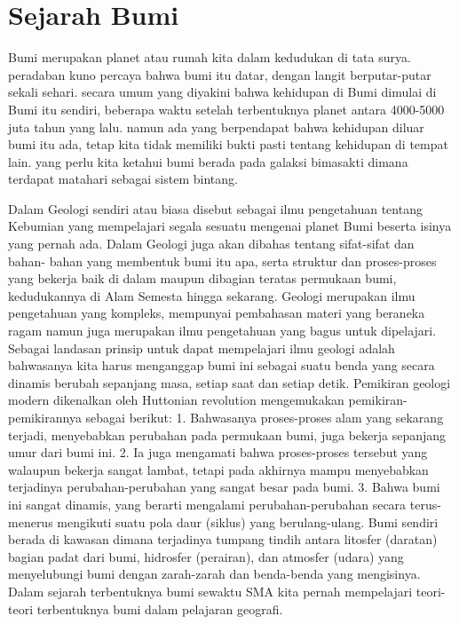 
\section{Sejarah Bumi}
Bumi merupakan planet atau rumah kita dalam kedudukan di tata surya. peradaban kuno percaya bahwa bumi itu datar, dengan langit berputar-putar sekali sehari. secara umum yang diyakini bahwa kehidupan di Bumi dimulai di Bumi itu sendiri, beberapa waktu setelah terbentuknya planet antara 4000-5000 juta tahun yang lalu. namun ada yang berpendapat bahwa kehidupan diluar bumi itu ada, tetap kita tidak memiliki bukti pasti tentang kehidupan di tempat lain. yang perlu kita ketahui bumi berada pada galaksi bimasakti dimana terdapat matahari sebagai sistem bintang.

Dalam Geologi sendiri atau biasa disebut sebagai ilmu pengetahuan tentang Kebumian yang mempelajari segala sesuatu mengenai planet Bumi beserta isinya yang pernah ada. Dalam Geologi juga akan dibahas tentang sifat-sifat dan bahan- bahan yang membentuk bumi itu apa, serta struktur dan proses-proses yang bekerja baik di dalam maupun dibagian teratas permukaan bumi, kedudukannya di Alam Semesta hingga sekarang. Geologi merupakan ilmu pengetahuan yang kompleks, mempunyai pembahasan materi yang beraneka ragam namun juga merupakan ilmu pengetahuan yang bagus untuk dipelajari. Sebagai landasan prinsip untuk dapat mempelajari ilmu geologi adalah bahwasanya kita harus menganggap bumi ini sebagai suatu benda yang secara dinamis berubah sepanjang masa, setiap saat dan setiap detik. 
Pemikiran geologi modern dikenalkan oleh Huttonian revolution mengemukakan pemikiran-pemikirannya sebagai berikut:
1. Bahwasanya proses-proses alam yang sekarang terjadi, menyebabkan perubahan pada permukaan bumi, juga bekerja sepanjang umur dari bumi ini. 
2. Ia juga mengamati bahwa proses-proses tersebut yang walaupun bekerja sangat lambat, tetapi pada akhirnya mampu menyebabkan terjadinya perubahan-perubahan yang sangat besar pada bumi. 
3. Bahwa bumi ini sangat dinamis, yang berarti mengalami perubahan-perubahan secara terus-menerus mengikuti suatu pola daur (siklus) yang berulang-ulang.
Bumi sendiri berada di kawasan dimana terjadinya tumpang tindih antara litosfer (daratan) bagian padat dari bumi, hidrosfer (perairan), dan atmosfer (udara) yang menyelubungi bumi dengan zarah-zarah dan benda-benda yang mengisinya.
Dalam sejarah terbentuknya bumi sewaktu SMA kita pernah mempelajari teori-teori terbentuknya bumi dalam pelajaran geografi.\cite{wetherill1990formation}

